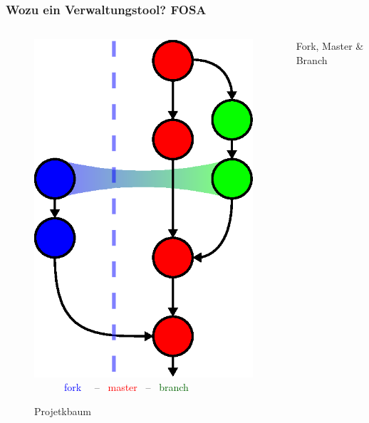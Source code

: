 \begin{frame}
	\frametitle{Wozu ein Verwaltungstool?\hfill{} \footnotesize{FOSA}}
	\begin{columns}
		\begin{column}{5cm}
			\begin{figure}
				\includegraphics[scale=0.5]{git_tree.eps}\\
				\textcolor{blue}{~~~~~~fork~~} -- 
				\textcolor{red}{~master~} -- 
				\textcolor{darkgreen}{~branch}
				\caption{Projetkbaum}
			\end{figure}
		\end{column}
		\begin{column}{5cm}
			\begin{block}{Fork, Master \& Branch}
				\begin{itemize}

\end{itemize}
\end{block}
\end{column}
\end{columns}
\end{frame}
